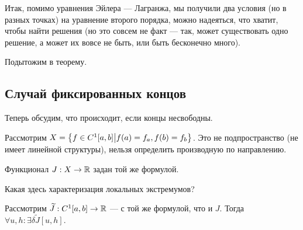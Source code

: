 \documentclass[a4paper]{article}
\begin{document}
    Итак, помимо уравнения Эйлера --- Лагранжа, мы получили два условия (но в разных точках) на уравнение второго порядка, можно надеяться, что хватит, чтобы найти решения (но это совсем не факт --- так, может существовать одно решение, а может их вовсе не быть, или быть бесконечно много).

    Подытожим в теорему.
    \subsection{Случай фиксированных концов}
    Теперь обсудим, что происходит, если концы несвободны.

    Рассмотрим $X = \left\{f \in C^1[a, b]\middle|f(a) = f_a, f(b) = f_b\right\}$.
    Это не подпространство (не имеет линейной структуры), нельзя определить производную по направлению.

    Функционал $J: X \rightarrow \mathbb{R}$ задан той же формулой.

    Какая здесь характеризация локальных экстремумов?

    Рассмотрим $\widetilde{J}: C^1[a, b] \rightarrow \mathbb{R}$ --- с той же формулой, что и $J$.
    Тогда $\forall u, h: \exists \delta\tilde{J}[u, h]$.
\end{document}
